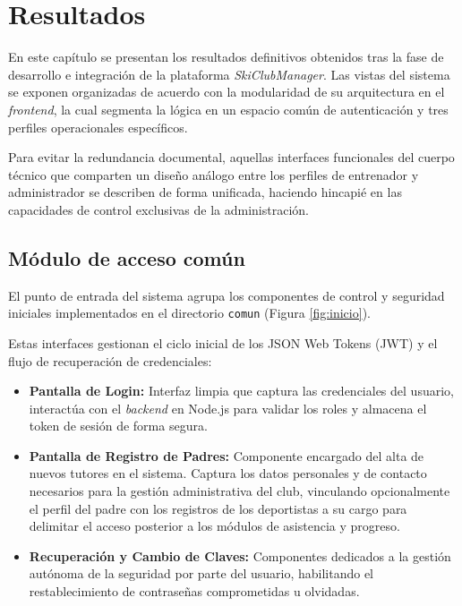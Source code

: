 \chapter{Resultados}
En este capítulo se presentan los resultados definitivos obtenidos tras la fase de desarrollo e integración de la plataforma \textit{SkiClubManager}. Las vistas del sistema se exponen organizadas de acuerdo con la modularidad de su arquitectura en el \textit{frontend}, la cual segmenta la lógica en un espacio común de autenticación y tres perfiles operacionales específicos.

Para evitar la redundancia documental, aquellas interfaces funcionales del cuerpo técnico que comparten un diseño análogo entre los perfiles de entrenador y administrador se describen de forma unificada, haciendo hincapié en las capacidades de control exclusivas de la administración.

\section{Módulo de acceso común}
El punto de entrada del sistema agrupa los componentes de control y seguridad iniciales implementados en el directorio \texttt{comun} (Figura \ref{fig:inicio}).

Estas interfaces gestionan el ciclo inicial de los JSON Web Tokens (JWT) y el flujo de recuperación de credenciales:
\begin{itemize}
    \item \textbf{Pantalla de Login:} Interfaz limpia que captura las credenciales del usuario, interactúa con el \textit{backend} en Node.js para validar los roles y almacena el token de sesión de forma segura.
    \item \textbf{Pantalla de Registro de Padres:} Componente encargado del alta de nuevos tutores en el sistema. Captura los datos personales y de contacto necesarios para la gestión administrativa del club, vinculando opcionalmente el perfil del padre con los registros de los deportistas a su cargo para delimitar el acceso posterior a los módulos de asistencia y progreso.
    \item \textbf{Recuperación y Cambio de Claves:} Componentes dedicados a la gestión autónoma de la seguridad por parte del usuario, habilitando el restablecimiento de contraseñas comprometidas u olvidadas.
\end{itemize}

